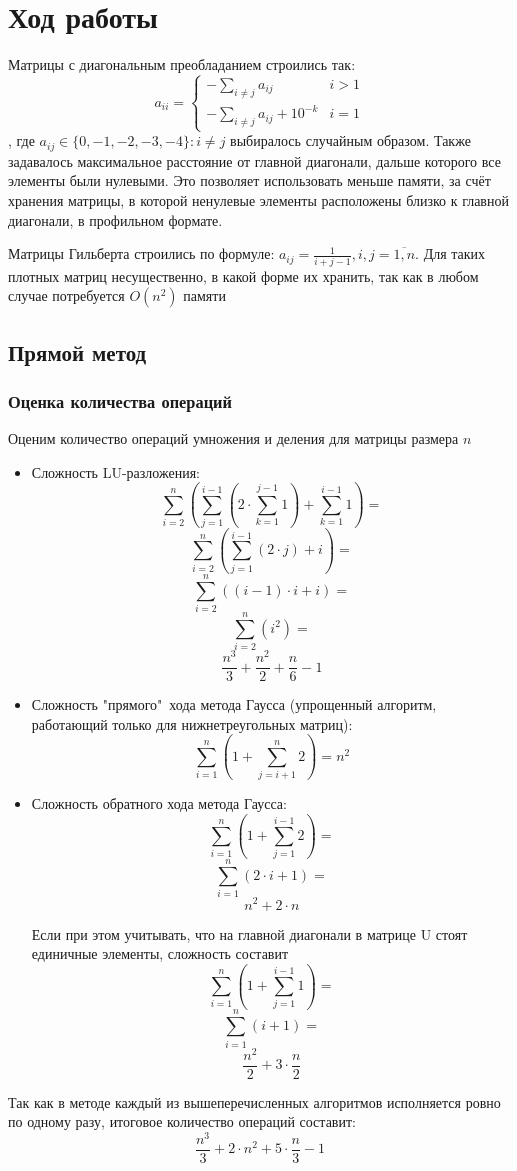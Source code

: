 \documentclass[english]{article}
\begin{document}
\section{Ход работы}
Матрицы с диагональным преобладанием строились так:
\[ a_{ii} = \begin{cases}
  -\sum\limits_{i \neq j} a_{ij} & i > 1 \\
  -\sum\limits_{i \neq j} a_{ij} + 10^{-k} & i = 1
\end{cases} \]
, где \(a_{ij} \in \{0, -1, -2, -3, -4\}: i \neq j \) выбиралось
случайным образом. Также задавалось максимальное расстояние от главной
диагонали, дальше которого все элементы были нулевыми. Это позволяет
использовать меньше памяти, за счёт хранения матрицы, в которой ненулевые
элементы расположены близко к главной диагонали, в профильном
формате.

Матрицы Гильберта строились по формуле: \(a_{ij} = \frac{1}{i + j -
  1}, i,j = \overline{1, n}\). Для таких плотных матриц несущественно,
в какой форме их хранить, так как в любом случае потребуется
\(O(n^2)\) памяти

\subsection{Прямой метод}
\subsubsection{Оценка количества операций}
Оценим количество операций умножения и деления для матрицы размера \(n\)
\begin{itemize}
\item Сложность LU-разложения:
\[ \sum_{i=2}^{n} (\sum_{j=1}^{i - 1} (2 \cdot \sum_{k=1}^{j-1} 1) + \sum_{k=1}^{i-1} 1) =\]
\[ \sum_{i=2}^{n} (\sum_{j=1}^{i - 1} (2 \cdot j) + i) =\]
\[ \sum_{i=2}^{n} ((i - 1) \cdot i + i) =\]
\[ \sum_{i=2}^{n} (i^2) =\]
\[ \frac{n^3}{3} + \frac{n^2}{2} + \frac{n}{6} - 1\]
\item Сложность "прямого"\ хода метода Гаусса (упрощенный алгоритм, работающий только для нижнетреугольных матриц):
\[ \sum_{i=1}^{n} (1 + \sum_{j=i+1}^{n} 2) = n^2\]
\item Сложность обратного хода метода Гаусса:
\[ \sum_{i=1}^{n} (1 + \sum_{j=1}^{i-1} 2) =\]
\[ \sum_{i=1}^{n} (2 \cdot i + 1) =\]
\[ n^2 + 2 \cdot n\]

Если при этом учитывать, что на главной диагонали в матрице U стоят единичные элементы, сложность составит
\[ \sum_{i=1}^{n} (1 + \sum_{j=1}^{i-1} 1) =\]
\[ \sum_{i=1}^{n} (i + 1) =\]
\[ \frac{n^2}{2} + 3 \cdot \frac{n}{2}\]
\end{itemize}
Так как в методе каждый из вышеперечисленных алгоритмов исполняется ровно по одному разу, итоговое количество операций составит:
\[ \frac{n^3}{3} + 2 \cdot n^2 + 5 \cdot \frac{n}{3} - 1\]
\end{document}
